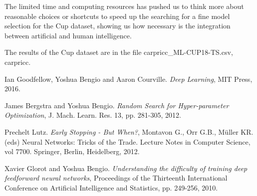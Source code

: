 \documentclass[11pt,twoside]{article}
\begin{document}
The limited time and computing resources has pushed us to think more about reasonable choices or shortcuts to speed up the searching for a fine model selection for the Cup dataset, showing us how necessary is the integration between artificial and human intelligence.

The results of the Cup dataset are in the file carpricc_ML-CUP18-TS.csv, carpricc.







\begin{thebibliography}{99} %
    Ian Goodfellow, Yoshua Bengio and Aaron Courville.
    \textit{Deep Learning}, MIT Press, 2016.

    James Bergstra and Yoshua Bengio.
    \textit{Random Search for Hyper-parameter Optimization}, J. Mach. Learn. Res. 13, pp. 281-305, 2012.

    Prechelt Lutz.
    \textit{Early Stopping - But When?}, Montavon G., Orr G.B., Müller KR. (eds) Neural Networks: Tricks of the
    Trade. Lecture Notes in Computer Science, vol 7700. Springer, Berlin, Heidelberg, 2012.

    Xavier Glorot and Yoshua Bengio.
    \textit{Understanding the difficulty of training deep feedforward neural networks},
    Proceedings of the Thirteenth International Conference on Artificial Intelligence and Statistics, pp.
    249-256, 2010.
\end{thebibliography}

\newpage


\end{document}
